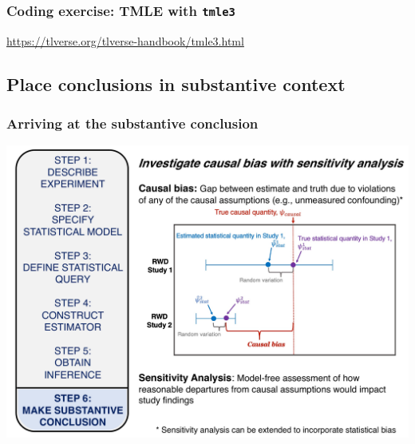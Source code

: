 \documentclass[t]{beamer}
\begin{document}

\begin{frame}
  \frametitle{Coding exercise: TMLE with \texttt{tmle3}}
  \url{https://tlverse.org/tlverse-handbook/tmle3.html}
\end{frame}

\subsection{Place conclusions in substantive context}

\begin{frame}
\frametitle{Arriving at the substantive conclusion}
\vspace{-16pt}
  \begin{center}
  \includegraphics[width = 1.02\textwidth]{figures/roadmap6.pdf}
  \end{center}
\end{frame}
\end{document}
